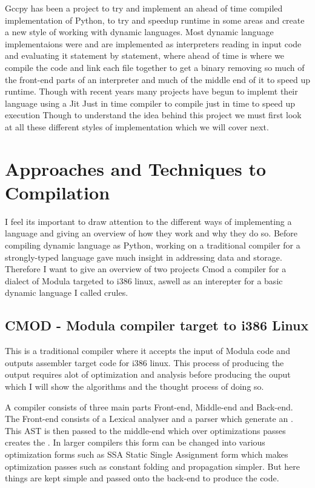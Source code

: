 \documentclass[defaultstyle,11pt]{article}
\begin{document}
Gccpy has been a project to try and implement an ahead of time compiled implementation of Python, to try and
speedup runtime in some areas and create a new style of working with dynamic languages. Most dynamic language implementaions
were and are implemented as interpreters reading in input code and evaluating it statement by statement, where ahead of time
is where we compile the code and link each file together to get a binary removing so much of the front-end parts of an interpreter
and much of the middle end of it to speed up runtime. Though with recent years many projects have begun to implemt their language
using a Jit Just in time compiler to compile just in time to speed up execution Though to understand the idea behind this project
we must first look at all these different styles of implementation which we will cover next.


\section{Approaches and Techniques to Compilation}

I feel its important to draw attention to the different ways of implementing a language and giving an overview of how they work
and why they do so. Before compiling dynamic language as Python, working on a traditional compiler for a strongly-typed language gave much
insight in addressing data and storage. Therefore I want to give an overview of two projects Cmod a compiler for a dialect of
Modula targeted to i386 linux, aswell as an interepter for a basic dynamic language I called crules.

\subsection{CMOD - Modula compiler target to i386 Linux}

This is a traditional compiler where it accepts the input of Modula code and outputs assembler target code for i386 linux. 
This process of producing the output requires alot of optimization and analysis before producing the ouput which I will
show the algorithms and the thought process of doing so.

A compiler consists of three main parts Front-end, Middle-end and Back-end. The Front-end consists of a Lexical
analyser and a parser which generate an . This AST is then passed to the
middle-end which over optimizations passes creates the . In larger
compilers this form can be changed into various optimization forms such as SSA Static Single Assignment form
which makes optimization passes such as constant folding and propagation simpler. But here things are kept simple
and passed onto the back-end to produce the code.
\end{document}
